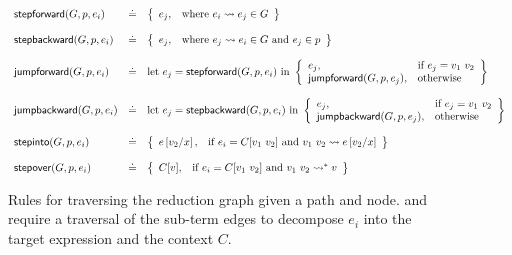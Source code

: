 \begin{figure*}[t]
\centering
\[
\begin{array}{lcl}
\stepforward{G}{p}{e_i}  &\defeq& \left\{\begin{array}{ll}
    e_j, & \text{where } \singlestep{e_i}{e_j} \in G
                         \end{array}\right\} \\ \\
\stepbackward{G}{p}{e_i}  &\defeq& \left\{\begin{array}{ll}
    e_j, & \text{where } \singlestep{e_j}{e_i} \in G \text{ and } e_j \in p
                         \end{array}\right\} \\ \\
\jumpforward{G}{p}{e_i} &\defeq& \text{let } e_j = \stepforward{G}{p}{e_i} \text{ in }
                         \left\{\begin{array}{ll}
                         e_j, & \text{if } e_j = \eapp{v_1}{v_2} \\
                         \jumpforward{G}{p}{e_{j}}, & \text{otherwise}
                         \end{array}\right\} \\ \\
\jumpbackward{G}{p}{e_i} &\defeq& \text{let } e_j = \stepbackward{G}{p}{e_i} \text{ in }
                         \left\{\begin{array}{ll}
                         e_j, & \text{if } e_j = \eapp{v_1}{v_2} \\
                         \jumpbackward{G}{p}{e_{j}}, & \text{otherwise}
                         \end{array}\right\} \\ \\
\stepinto{G}{p}{e_i} &\defeq& \left\{\begin{array}{ll}
                         e\sub{x}{v_2}, & \text{if } e_i = C[\eapp{v_1}{v_2}] \text{ and } \singlestep{\eapp{v_1}{v_2}}{e\sub{x}{v_2}}
                         \end{array}\right\} \\ \\
\stepover{G}{p}{e_i} &\defeq& \left\{\begin{array}{ll}
                         C[v], & \text{if } e_i = C[\eapp{v_1}{v_2}] \text{ and } \multistep{\eapp{v_1}{v_2}}{v}
                         \end{array}\right\}
\end{array}
\]
\caption{Rules for traversing the reduction graph given a path and
  node. \stepintosym and \stepoversym require a traversal of the
  sub-term edges to decompose $e_i$ into the target expression
   and the context $C$.   }
\label{fig:traversing-graph}
\end{figure*}


